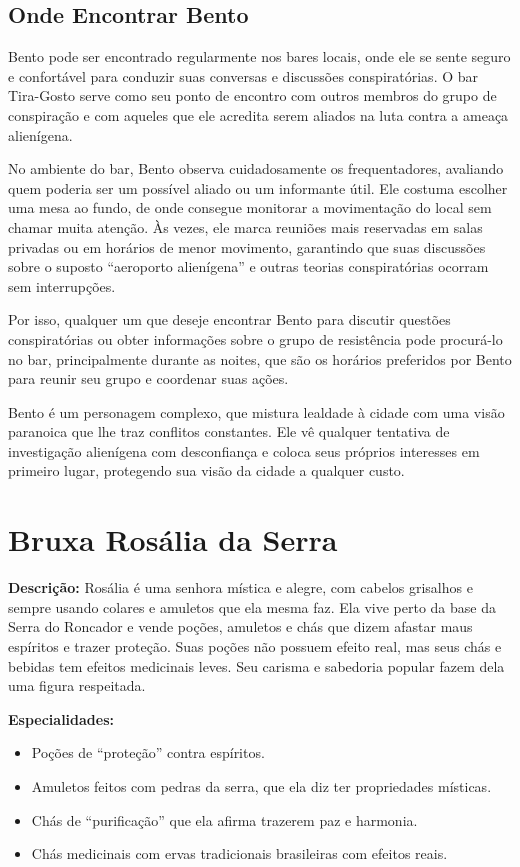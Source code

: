 \subsection*{Onde Encontrar Bento}

Bento pode ser encontrado regularmente nos bares locais,  onde ele se sente seguro e confortável para conduzir suas conversas e discussões conspiratórias. O bar Tira-Gosto serve como seu ponto de encontro com outros membros do grupo de conspiração e com aqueles que ele acredita serem aliados na luta contra a ameaça alienígena.

No ambiente do bar, Bento observa cuidadosamente os frequentadores, avaliando quem poderia ser um possível aliado ou um informante útil. Ele costuma escolher uma mesa ao fundo, de onde consegue monitorar a movimentação do local sem chamar muita atenção. Às vezes, ele marca reuniões mais reservadas em salas privadas ou em horários de menor movimento, garantindo que suas discussões sobre o suposto ``aeroporto alienígena'' e outras teorias conspiratórias ocorram sem interrupções.

Por isso, qualquer um que deseje encontrar Bento para discutir questões conspiratórias ou obter informações sobre o grupo de resistência pode procurá-lo no bar, principalmente durante as noites, que são os horários preferidos por Bento para reunir seu grupo e coordenar suas ações.


Bento é um personagem complexo, que mistura lealdade à cidade com uma visão paranoica que lhe traz conflitos constantes. Ele vê qualquer tentativa de investigação alienígena com desconfiança e coloca seus próprios interesses em primeiro lugar, protegendo sua visão da cidade a qualquer custo.



\section{Bruxa Rosália da Serra}
\textbf{Descrição:}  
Rosália é uma senhora mística e alegre, com cabelos grisalhos e sempre usando colares e amuletos que ela mesma faz. Ela vive perto da base da Serra do Roncador e vende poções, amuletos e chás que dizem afastar maus espíritos e trazer proteção. Suas poções não possuem efeito real, mas seus chás e bebidas tem efeitos medicinais leves. Seu carisma e sabedoria popular fazem dela uma figura respeitada.

\textbf{Especialidades:}  
\begin{itemize}
    \item Poções de ``proteção'' contra espíritos.
    \item Amuletos feitos com pedras da serra, que ela diz ter propriedades místicas.
    \item Chás de ``purificação'' que ela afirma trazerem paz e harmonia.
    \item Chás medicinais com ervas tradicionais brasileiras com efeitos reais.
\end{itemize}

